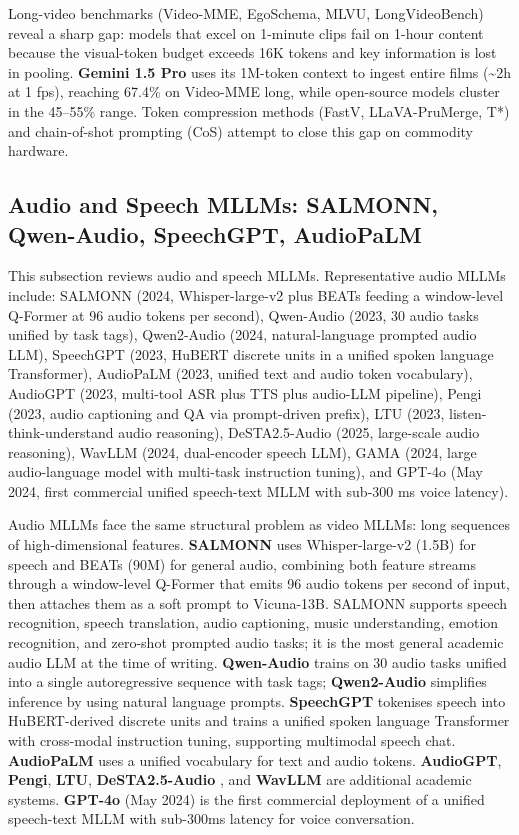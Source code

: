 \documentclass{article}
\begin{document}
Long-video benchmarks (Video-MME, EgoSchema, MLVU, LongVideoBench) reveal a sharp gap: models that excel on 1-minute clips fail on 1-hour content because the visual-token budget exceeds 16K tokens and key information is lost in pooling. \textbf{Gemini 1.5 Pro} uses its 1M-token context to ingest entire films (\textasciitilde2h at 1 fps), reaching 67.4\% on Video-MME long, while open-source models cluster in the 45--55\% range. Token compression methods (FastV, LLaVA-PruMerge, T*) and chain-of-shot prompting (CoS) \citep{hu20242024} attempt to close this gap on commodity hardware.

\subsection{Audio and Speech MLLMs: SALMONN, Qwen-Audio, SpeechGPT, AudioPaLM}\label{audio-and-speech-mllms-salmonn-qwen-audio-speechgpt-audiopalm}

This subsection reviews audio and speech MLLMs. Representative audio MLLMs include: SALMONN (2024, Whisper-large-v2 plus BEATs feeding a window-level Q-Former at 96 audio tokens per second), Qwen-Audio (2023, 30 audio tasks unified by task tags), Qwen2-Audio (2024, natural-language prompted audio LLM), SpeechGPT (2023, HuBERT discrete units in a unified spoken language Transformer), AudioPaLM (2023, unified text and audio token vocabulary), AudioGPT (2023, multi-tool ASR plus TTS plus audio-LLM pipeline), Pengi (2023, audio captioning and QA via prompt-driven prefix), LTU (2023, listen-think-understand audio reasoning), DeSTA2.5-Audio (2025, large-scale audio reasoning), WavLLM (2024, dual-encoder speech LLM), GAMA (2024, large audio-language model with multi-task instruction tuning), and GPT-4o (May 2024, first commercial unified speech-text MLLM with sub-300 ms voice latency).

Audio MLLMs face the same structural problem as video MLLMs: long sequences of high-dimensional features. \textbf{SALMONN} \citep{tang20242024} uses Whisper-large-v2 (1.5B) for speech and BEATs (90M) for general audio, combining both feature streams through a window-level Q-Former that emits 96 audio tokens per second of input, then attaches them as a soft prompt to Vicuna-13B. SALMONN supports speech recognition, speech translation, audio captioning, music understanding, emotion recognition, and zero-shot prompted audio tasks; it is the most general academic audio LLM at the time of writing. \textbf{Qwen-Audio} \citep{chu20232023} trains on 30 audio tasks unified into a single autoregressive sequence with task tags; \textbf{Qwen2-Audio} simplifies inference by using natural language prompts. \textbf{SpeechGPT} \citep{zhang2023videollamaaninstru} tokenises speech into HuBERT-derived discrete units and trains a unified spoken language Transformer with cross-modal instruction tuning, supporting multimodal speech chat. \textbf{AudioPaLM} uses a unified vocabulary for text and audio tokens. \textbf{AudioGPT}, \textbf{Pengi}, \textbf{LTU}, \textbf{DeSTA2.5-Audio} \citep{lu20242024}, and \textbf{WavLLM} are additional academic systems. \textbf{GPT-4o} (May 2024) is the first commercial deployment of a unified speech-text MLLM with sub-300ms latency for voice conversation.
\end{document}
